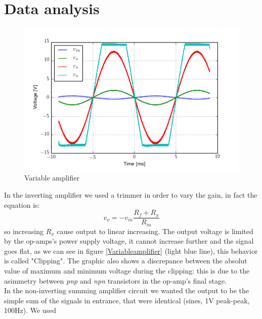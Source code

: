 \section{Data analysis}
\begin{figure}[H]
\centering
\includegraphics[width=.7\textwidth]{2/Variable_amplifier.png}
\caption{Variable amplifier}\label{Variableamplifier}
\end{figure}
In the inverting amplifier we used a trimmer in order to vary the gain, in fact the equation is:
\[v_{o} = -v_{in}\frac{R_f+R_x}{R_{in}}\]
so increasing $R_x$ cause output to linear increasing. The output voltage is limited by the op-amps's power supply voltage, it cannot increase further and the signal goes flat, as we can see in figure \eqref{Variableamplifier} (light blue line), this behavior is called "Clipping". The graphic also shows a discrepance between the absolut value of maximum and minimum voltage during the clipping: this is due to the asimmetry between \emph{pnp} and \emph{npn} transistors in the op-amp's final stage.\\

In the non-inverting summing amplifier circuit we wanted the output to be the simple sum of the signals in entrance, that were identical (sines, 1V peak-peak, 100Hz). We used
